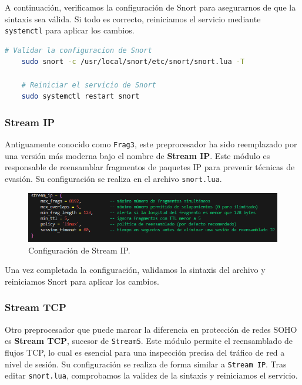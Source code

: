 \documentclass[11pt,a4paper,twoside]{report}
\begin{document}
A continuación, verificamos la configuración de Snort para asegurarnos de que la sintaxis sea válida. Si todo es correcto, reiniciamos el servicio mediante \texttt{systemctl} para aplicar los cambios.

\newpage

\begin{lstlisting}[language=bash, label={lst:validacion-snort}]
	# Validar la configuracion de Snort
	sudo snort -c /usr/local/snort/etc/snort/snort.lua -T
	
	# Reiniciar el servicio de Snort
	sudo systemctl restart snort
\end{lstlisting}


\subsubsection*{Stream IP}

Antiguamente conocido como \texttt{Frag3}, este preprocesador ha sido reemplazado por una versión más moderna bajo el nombre de \textbf{Stream IP}. Este módulo es responsable de reensamblar fragmentos de paquetes IP para prevenir técnicas de evasión. Su configuración se realiza en el archivo \texttt{snort.lua}.

\begin{figure}[H]
	\centering
	\includegraphics[scale=0.8]{stream_ip/1.png}
	\caption{Configuración de Stream IP.}
\end{figure}

Una vez completada la configuración, validamos la sintaxis del archivo y reiniciamos Snort para aplicar los cambios.

\newpage

\subsubsection*{Stream TCP}

Otro preprocesador que puede marcar la diferencia en protección de redes SOHO es \textbf{Stream TCP}, sucesor de \texttt{Stream5}. Este módulo permite el reensamblado de flujos TCP, lo cual es esencial para una inspección precisa del tráfico de red a nivel de sesión. Su configuración se realiza de forma similar a \texttt{Stream IP}. Tras editar \texttt{snort.lua}, comprobamos la validez de la sintaxis y reiniciamos el servicio.
\end{document}

